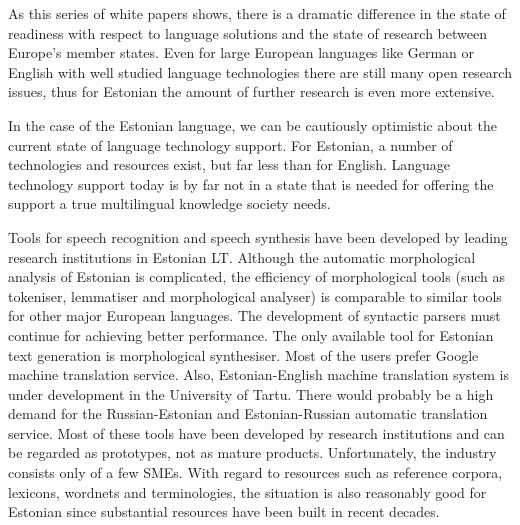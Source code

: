\begin{multicols}{2}

As this series of white papers shows, there is a dramatic difference in the state of readiness with respect to language solutions and the state of research between Europe’s member states. Even for large European languages like German or English with well studied language technologies there are still many open research issues, thus for Estonian the amount of further research is even more extensive. 

In the case of the Estonian language, we can be cautiously optimistic about the current state of language technology support. 
For Estonian, a number of technologies and resources exist, but far less than for English. 
Language technology support today is by far not in a state that is needed for offering the support a true multilingual knowledge society needs.

Tools for speech recognition and speech synthesis have been developed by leading research institutions in Estonian LT.
Although the automatic morphological analysis of Estonian is complicated, the efficiency of morphological tools (such as tokeniser, lemmatiser and morphological analyser) is comparable to similar tools for other major European languages. 
The development of syntactic parsers must continue for achieving better performance.
The only available tool for Estonian text generation is morphological synthesiser.
Most of the users prefer Google machine translation service. Also, Estonian-English machine translation system is under development in the University of Tartu. There would probably be a high demand for the Russian-Estonian and Estonian-Russian automatic translation service.
Most of these tools have been developed by research institutions and can be regarded as prototypes, not as mature products. Unfortunately, the industry consists only of a few SMEs.
With regard to resources such as reference corpora, lexicons, wordnets and terminologies, the situation is also reasonably good for Estonian since substantial resources have been built in recent decades. 



\end{multicols}
